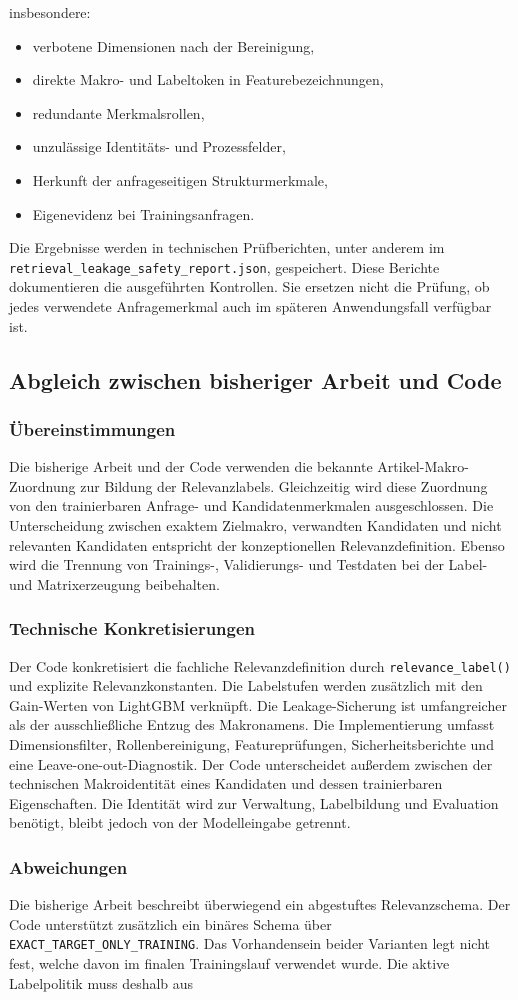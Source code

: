 insbesondere: \begin{itemize} \item verbotene Dimensionen nach der Bereinigung, \item direkte Makro- und Labeltoken in Featurebezeichnungen, \item redundante Merkmalsrollen, \item unzulässige Identitäts- und Prozessfelder, \item Herkunft der anfrageseitigen Strukturmerkmale, \item Eigenevidenz bei Trainingsanfragen. \end{itemize} Die Ergebnisse werden in technischen Prüfberichten, unter anderem im \texttt{retrieval\_leakage\_safety\_report.json}, gespeichert. Diese Berichte dokumentieren die ausgeführten Kontrollen. Sie ersetzen nicht die Prüfung, ob jedes verwendete Anfragemerkmal auch im späteren Anwendungsfall verfügbar ist. \subsection{Abgleich zwischen bisheriger Arbeit und Code} \label{subsec:abgleich_labels_leakage} \subsubsection*{Übereinstimmungen} Die bisherige Arbeit und der Code verwenden die bekannte Artikel-Makro-Zuordnung zur Bildung der Relevanzlabels. Gleichzeitig wird diese Zuordnung von den trainierbaren Anfrage- und Kandidatenmerkmalen ausgeschlossen. Die Unterscheidung zwischen exaktem Zielmakro, verwandten Kandidaten und nicht relevanten Kandidaten entspricht der konzeptionellen Relevanzdefinition. Ebenso wird die Trennung von Trainings-, Validierungs- und Testdaten bei der Label- und Matrixerzeugung beibehalten. \subsubsection*{Technische Konkretisierungen} Der Code konkretisiert die fachliche Relevanzdefinition durch \texttt{relevance\_label()} und explizite Relevanzkonstanten. Die Labelstufen werden zusätzlich mit den Gain-Werten von LightGBM verknüpft. Die Leakage-Sicherung ist umfangreicher als der ausschließliche Entzug des Makronamens. Die Implementierung umfasst Dimensionsfilter, Rollenbereinigung, Featureprüfungen, Sicherheitsberichte und eine Leave-one-out-Diagnostik. Der Code unterscheidet außerdem zwischen der technischen Makroidentität eines Kandidaten und dessen trainierbaren Eigenschaften. Die Identität wird zur Verwaltung, Labelbildung und Evaluation benötigt, bleibt jedoch von der Modelleingabe getrennt. \subsubsection*{Abweichungen} Die bisherige Arbeit beschreibt überwiegend ein abgestuftes Relevanzschema. Der Code unterstützt zusätzlich ein binäres Schema über \texttt{EXACT\_TARGET\_ONLY\_TRAINING}. Das Vorhandensein beider Varianten legt nicht fest, welche davon im finalen Trainingslauf verwendet wurde. Die aktive Labelpolitik muss deshalb aus 